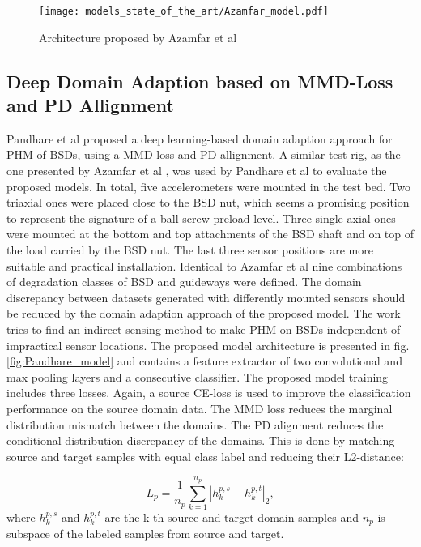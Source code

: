 \begin{figure}[H]
  \centering
  \texttt{[image: models\_state\_of\_the\_art/Azamfar\_model.pdf]}
  \caption{Architecture proposed by Azamfar et al \cite{AZAMFAR2020103932}}
  \label{fig:Azamfar_model}
\end{figure}


\subsection{Deep Domain Adaption based on MMD-Loss and PD Allignment}
Pandhare et al \cite{Pandhare2021} proposed a deep learning-based domain adaption approach for PHM of BSDs, using a MMD-loss and PD allignment. A similar test rig, as the one presented by Azamfar et al \cite{AZAMFAR2020103932}, was used by Pandhare et al to evaluate the proposed models. In total, five accelerometers were mounted in the test bed. Two triaxial ones were placed close to the BSD nut, which seems a promising position to represent the signature of a ball screw preload level. Three single-axial ones were mounted at the bottom and top attachments of the BSD shaft and on top of the load carried by the BSD nut. The last three sensor positions are more suitable and practical installation. Identical to Azamfar et al \cite{AZAMFAR2020103932} nine combinations of degradation classes of BSD and guideways were defined. The domain discrepancy between datasets generated with differently mounted sensors should be reduced by the domain adaption approach of the proposed model. The work tries to find an indirect sensing method to make PHM on BSDs independent of impractical sensor locations. The proposed model architecture is presented in fig. \ref{fig:Pandhare_model} and contains a feature extractor of two convolutional and max pooling layers and a consecutive classifier. The proposed model training includes three losses. Again, a source CE-loss is used to improve the classification performance on the source domain data. The MMD loss reduces the marginal distribution mismatch between the domains. The PD alignment reduces the conditional distribution discrepancy of the domains. This is done by matching source and target samples with equal class label and reducing their L2-distance: 

\begin{equation}
    L_{p} = \frac{1}{n_{p}}\sum_{k=1}^{n_{p}}|h_{k}^{p,s}-h_{k}^{p,t}|_{2}, 
\end{equation}
where $h_{k}^{p,s}$ and $h_{k}^{p,t}$ are the k-th source and target domain samples and $n_{p}$ is subspace of the labeled samples from source and target. 

